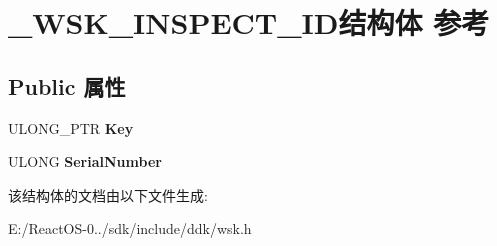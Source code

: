 \hypertarget{struct___w_s_k___i_n_s_p_e_c_t___i_d}{}\section{\+\_\+\+W\+S\+K\+\_\+\+I\+N\+S\+P\+E\+C\+T\+\_\+\+I\+D结构体 参考}
\label{struct___w_s_k___i_n_s_p_e_c_t___i_d}
\subsection*{Public 属性}
\begin{DoxyCompactItemize}
\item 
\mbox{\label{struct___w_s_k___i_n_s_p_e_c_t___i_d_a4fb5aa8f1dd69b5094c2535a69f73cbc}} 
U\+L\+O\+N\+G\+\_\+\+P\+TR {\bfseries Key}
\item 
\mbox{\label{struct___w_s_k___i_n_s_p_e_c_t___i_d_a929ab788d7b62eb43771fc55d0b6c46c}} 
U\+L\+O\+NG {\bfseries Serial\+Number}
\end{DoxyCompactItemize}


该结构体的文档由以下文件生成\+:\begin{DoxyCompactItemize}
\item 
E\+:/\+React\+O\+S-\/0../sdk/include/ddk/wsk.\+h\end{DoxyCompactItemize}
